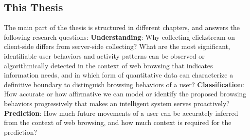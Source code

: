 \subsection{This Thesis}



The main part of the thesis is structured in different chapters, and answers the following
research questions:
\textbf{Understanding}: Why collecting clickstream on client-side differs from server-side collecting?
What are the most significant, identifiable user behaviors and activity patterns 
can be observed or algorithmically detected in the context of web browsing that 
indicates information needs,
and in which form of quantitative data can characterize a definitive boundary to 
distinguish browsing behaviors of a user?
\textbf{Classification}: How accurate or how affirmative we can model or identify 
the proposed browsing behaviors progressively that makes an intelligent system 
serves proactively? \textbf{Prediction}: How much future movements of a user can be accurately inferred 
from the context of web browsing, and how much context is required for the prediction?

